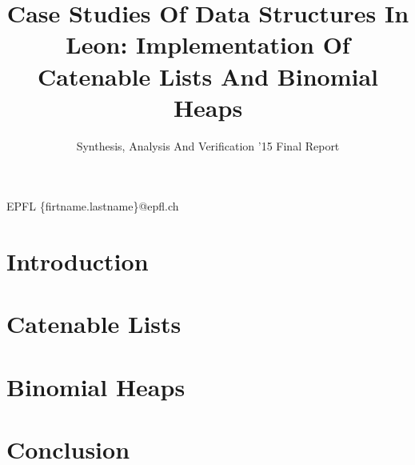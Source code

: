 \documentclass[nocopyrightspace,11pt,authoryear,preprint]{sigplanconf}
\begin{document}


\title{Case Studies Of Data Structures In Leon: Implementation Of Catenable Lists And Binomial Heaps}
\subtitle{Synthesis, Analysis And Verification '15 Final Report}

           {EPFL}
           {\{firtname.lastname\}@epfl.ch}

\maketitle

\section{Introduction}


\section{Catenable Lists}


\section{Binomial Heaps}


\section{Conclusion}





\end{document}

